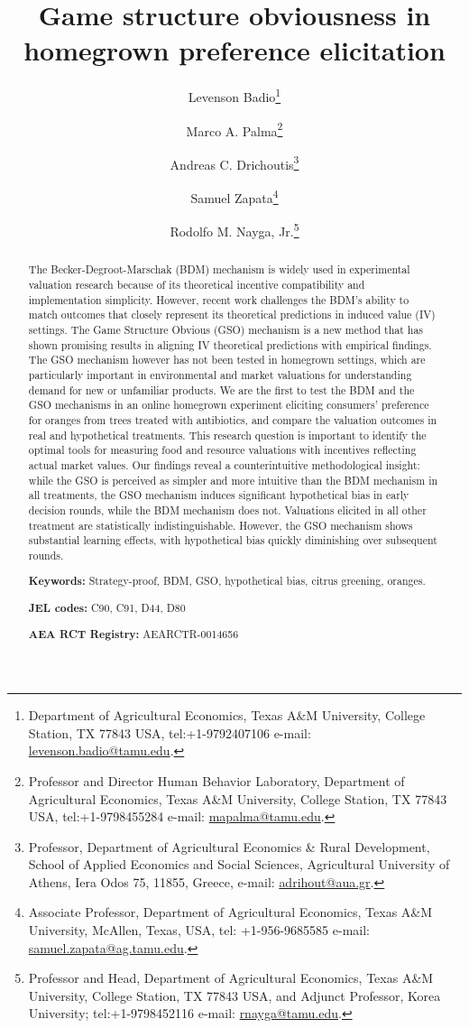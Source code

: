 \documentclass[12pt]{article}
\title{\textbf{Game structure obviousness in homegrown preference elicitation}}
\author[1]{Levenson Badio\thanks{Department of Agricultural Economics, Texas A\&M University, College Station, TX  77843 USA, tel:+1-9792407106 e-mail: \href{mailto:levenson.badio@tamu.edu}{levenson.badio@tamu.edu}.}}
\author[1]{Marco A. Palma\thanks{Professor and Director Human Behavior Laboratory, Department of Agricultural Economics, Texas A\&M University, College Station, TX  77843 USA, tel:+1-9798455284 e-mail: \href{mailto:mapalma@tamu.edu}{mapalma@tamu.edu}.}}
\author[2]{Andreas C. Drichoutis\thanks{Professor, Department of Agricultural Economics \& Rural Development, School of Applied Economics and Social Sciences, Agricultural University of Athens, Iera Odos 75, 11855, Greece, e-mail: \href{mailto:adrihout@aua.gr}{adrihout@aua.gr}.}}
\author[1]{Samuel Zapata\thanks{Associate Professor, Department of Agricultural Economics, Texas A\&M University, McAllen, Texas, USA, tel: +1-956-9685585 e-mail: \href{samuel.zapata@ag.tamu.edu}{samuel.zapata@ag.tamu.edu}.}}
\author[1]{Rodolfo M. Nayga, Jr.\thanks{Professor and Head, Department of Agricultural Economics, Texas A\&M University, College Station, TX  77843 USA, and Adjunct Professor, Korea University; tel:+1-9798452116 e-mail: \href{mailto:rnayga@tamu.edu}{rnayga@tamu.edu}.}}
\affil[1]{Texas A\&M University}
\affil[2]{Agricultural University of Athens}
\date{}
\begin{document}
\maketitle
 \onehalfspacing

\begin{abstract}
\noindent The Becker-Degroot-Marschak (BDM) mechanism is widely used in experimental valuation research because of its theoretical incentive compatibility and implementation simplicity. However, recent work challenges the BDM's ability to match outcomes that closely represent its theoretical predictions in induced value (IV) settings. The Game Structure Obvious (GSO) mechanism is a new method that has shown promising results in aligning IV theoretical predictions with empirical findings. The GSO mechanism however has not been tested in homegrown settings, which are particularly important in environmental and market valuations for understanding demand for new or unfamiliar products. We are the first to test the BDM and the GSO mechanisms in an online homegrown experiment eliciting consumers' preference for oranges from trees treated with antibiotics, and compare the valuation outcomes in real and hypothetical treatments. This research question is important to identify the optimal tools for measuring food and resource valuations with incentives reflecting actual market values. Our findings reveal a counterintuitive methodological insight: while the GSO is perceived as simpler and more intuitive than the BDM mechanism in all treatments, the GSO mechanism induces significant hypothetical bias in early decision rounds, while the BDM mechanism does not. Valuations elicited in all other treatment are statistically indistinguishable. However, the GSO mechanism shows substantial learning effects, with hypothetical bias quickly diminishing over subsequent rounds. 

\textbf{Keywords:} Strategy-proof, BDM, GSO, hypothetical bias, citrus greening, oranges. 
	
\textbf{JEL codes:} C90, C91, D44, D80
 
 \textbf{AEA RCT Registry:} AEARCTR-0014656
 
 \end{abstract}


\onehalfspacing
\end{document}
